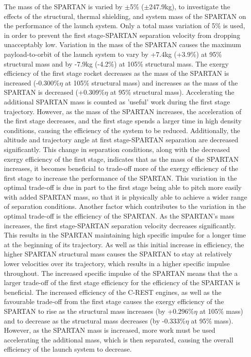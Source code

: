 The mass of the SPARTAN is varied by $\pm$5\% ($\pm$247.9kg), to investigate the effects of the structural, thermal shielding, and system mass of the SPARTAN on the performance of the launch system. Only a total mass variation of 5\% is used, in order to prevent the first stage-SPARTAN separation velocity from dropping unacceptably low. 
Variation in the mass of the SPARTAN causes the maximum payload-to-orbit of the launch system to vary by +7.4kg (+3.9\%) at 95\% structural mass and by -7.9kg (-4.2\%) at 105\% structural mass. 
The exergy efficiency of the first stage rocket decreases as the mass of the SPARTAN is increased (-0.300\%$\eta$  at 105\% structural mass) and increases as the mass of the SPARTAN is decreased (+0.309\%$\eta$  at 95\% structural mass). Accelerating the additional SPARTAN mass is counted as 'useful' work during the first stage trajectory. However, as the mass of the SPARTAN increases, the acceleration of the first stage decreases, and the first stage spends a larger time in high density conditions, causing the efficiency of the system to be reduced.
Additionally, the altitude and trajectory angle at first stage-SPARTAN separation are decreased significantly. This change in separation conditions, along with the decreased exergy efficiency of the first stage, indicates that as the mass of the SPARTAN increases, it becomes beneficial to trade-off more of the exergy efficiency of the first stage to increase the performance of the SPARTAN. This variation in the optimal trade-off is due in part to the first stage being able to pitch more easily with added SPARTAN mass, so that it is physically able to achieve a wider range of separation conditions. Another factor which contributes to the variation in the optimal trade-off is the efficiency of the SPARTAN. As the SPARTAN's mass increases, the first stage-SPARTAN separation velocity decreases significantly. This results in the SPARTAN maintaining high specific impulse for a longer time at the beginning of its trajectory. As well as this initial increase in efficiency, the higher SPARTAN structural mass causes the SPARTAN to stay at relatively lower velocities over its trajectory, which results in a higher specific impulse throughout. The increased specific impulse of the SPARTAN means that the a larger trade-off of the first stage efficiency for the efficiency of the SPARTAN is beneficial. 
The increased efficiency of the C-REST engines, as well as the favourable trade-off from the first stage causes the exergy efficiency of the SPARTAN to rise as the structural mass increases (by +0.296\%$\eta$ at 105\% mass) and to decrease as the structural mass decreases (by -0.333\%$\eta$ at 95\% mass). However, as the SPARTAN mass is increased, more work must be used accelerating the additional mass, which is then separated, causing the overall efficiency of the launch system to decrease. 

